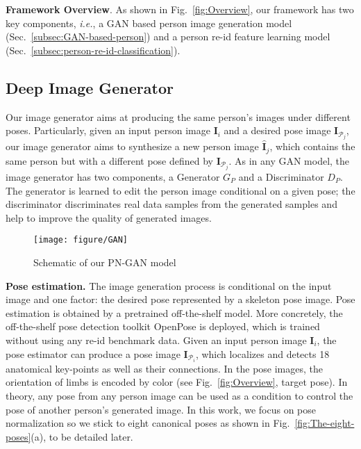 \documentclass[10pt,letterpaper,twocolumn,10pt,letterpaper,twocolumn]{article}
\begin{document}
\noindent \textbf{Framework Overview}. As shown in Fig.~\ref{fig:Overview},
our framework has two key components, \emph{i.e.}, a GAN based person
image generation model (Sec.~\ref{subsec:GAN-based-person}) and
a person re-id feature learning model (Sec.~\ref{subsec:person-re-id-classification}).

\subsection{Deep Image Generator\label{subsec:GAN-based-person}}

\noindent Our image generator aims at producing the same person's
images under different poses. Particularly, given an input person
image $\mathbf{I}_{i}$ and a desired pose image $\mathbf{I}_{\mathcal{P}_{j}}$,
our image generator aims to synthesize a new person image $\hat{\mathbf{I}}_{j}$,
which contains the same person but with a different pose defined by
$\mathbf{I}_{\mathcal{P}_{j}}$. As in any GAN model, the image generator
has two components, a Generator $G_{P}$ and a Discriminator $D_{P}$.
The generator is learned to edit the person image conditional on a
given pose; the discriminator discriminates real data samples from
the generated samples and help to improve the quality of generated
images.

\begin{figure}
\begin{centering}
\texttt{[image: figure/GAN]}
\par\end{centering}
\caption{\label{fig:gan} Schematic of our PN-GAN model}
\end{figure}

\vspace{0.1in}

\noindent \textbf{Pose estimation.} The image generation process is
conditional on the input image and one  factor: the desired pose represented
by a skeleton pose image. Pose estimation is obtained by a pretrained
off-the-shelf model. More concretely, the off-the-shelf pose detection
toolkit \textendash{} OpenPose \cite{cao2017realtime} is deployed,
which is trained without using any re-id benchmark data. Given an
input person image $\mathbf{I}_{i}$, the pose estimator can produce
a pose image $\mathbf{I}_{\mathcal{P}_{i}}$, which localizes and
detects 18 anatomical key-points as well as their connections. In
the pose images, the orientation of limbs is encoded by color (see
Fig.~\ref{fig:Overview}, target pose). In theory, any pose from
any person image can be used as a condition to control the pose of
another person's generated image. In this work, we focus on pose normalization
so we stick to eight canonical poses as shown in Fig.~\ref{fig:The-eight-poses}(a),
to be detailed later.
\end{document}
